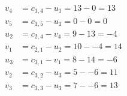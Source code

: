 \[
\begin{aligned}
v_{4} &= c_{1,4} - u_{1} = 13 - 0 = 13 \\
v_{5} &= c_{1,5} - u_{1} = 0 - 0 = 0 \\
u_{2} &= c_{2,4} - v_{4} = 9 - 13 = -4 \\
v_{1} &= c_{2,1} - u_{2} = 10 - -4 = 14 \\
u_{3} &= c_{3,1} - v_{1} = 8 - 14 = -6 \\
v_{2} &= c_{3,2} - u_{3} = 5 - -6 = 11 \\
v_{3} &= c_{3,3} - u_{3} = 7 - -6 = 13 \\
\end{aligned}
\]


